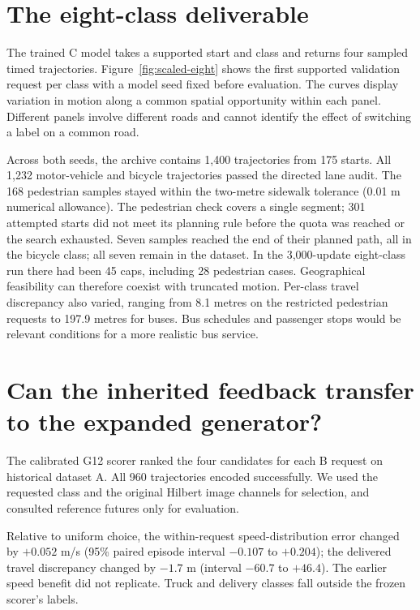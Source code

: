 \section{The eight-class deliverable}
The trained C model takes a supported start and class and returns four sampled timed trajectories. Figure~\ref{fig:scaled-eight} shows the first supported validation request per class with a model seed fixed before evaluation. The curves display variation in motion along a common spatial opportunity within each panel. Different panels involve different roads and cannot identify the effect of switching a label on a common road.


Across both seeds, the archive contains 1,400 trajectories from 175 starts. All 1,232 motor-vehicle and bicycle trajectories passed the directed lane audit. The 168 pedestrian samples stayed within the two-metre sidewalk tolerance (0.01 m numerical allowance). The pedestrian check covers a single segment; 301 attempted starts did not meet its planning rule before the quota was reached or the search exhausted. Seven samples reached the end of their planned path, all in the bicycle class; all seven remain in the dataset. In the 3,000-update eight-class run there had been 45 caps, including 28 pedestrian cases. Geographical feasibility can therefore coexist with truncated motion. Per-class travel discrepancy also varied, ranging from 8.1 metres on the restricted pedestrian requests to 197.9 metres for buses. Bus schedules and passenger stops would be relevant conditions for a more realistic bus service.

\section{Can the inherited feedback transfer to the expanded generator?}
The calibrated G12 scorer ranked the four candidates for each B request on historical dataset A. All 960 trajectories encoded successfully. We used the requested class and the original Hilbert image channels for selection, and consulted reference futures only for evaluation.

Relative to uniform choice, the within-request speed-distribution error changed by $+0.052$ m/s (95\% paired episode interval $-0.107$ to $+0.204$); the delivered travel discrepancy changed by $-1.7$ m (interval $-60.7$ to $+46.4$). The earlier speed benefit did not replicate. Truck and delivery classes fall outside the frozen scorer’s labels.
